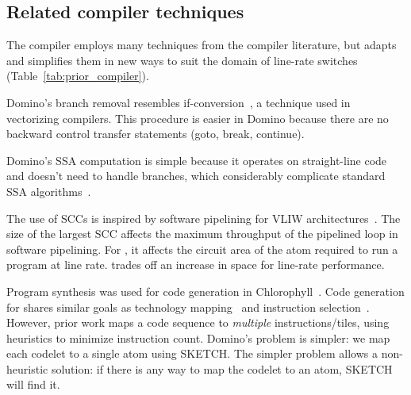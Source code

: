 \subsection{Related compiler techniques}
\label{ss:related_compiler}

The \pktlanguage compiler employs many techniques from the compiler literature,
but adapts and simplifies them in new ways to suit the domain of line-rate
switches (Table~\ref{tab:prior_compiler}).

Domino's branch removal resembles if-conversion~\cite{if_conversion}, a
technique used in vectorizing compilers. This procedure is easier in Domino
because there are no backward control transfer statements (goto, break,
continue).

Domino's SSA computation is simple because it operates on straight-line
code and doesn't need to handle branches, which considerably complicate
standard SSA algorithms~\cite{ssa}.

The use of SCCs is inspired by software pipelining for VLIW
architectures~\cite{software_pipelining}. The size of the largest SCC
affects the maximum throughput of the pipelined loop in software
pipelining. For \pktlanguage, it affects the circuit area of the atom
required to run a program at line rate. \pktlanguage trades off an increase
in space for line-rate performance.
    
Program synthesis was used for code generation in
Chlorophyll~\cite{chlorophyll}.  Code generation for \pktlanguage shares
similar goals as technology mapping~\cite{micheli, flowmap, spectransform}
and instruction selection~\cite{muchnik}.  However, prior work maps a code
sequence to \textit{multiple} instructions/tiles, using heuristics to
minimize instruction count. Domino's problem is simpler: we map each
codelet to a single atom using SKETCH.  The simpler problem allows a non-
heuristic solution: if there is any way to map the codelet to an atom, SKETCH
will find it.
